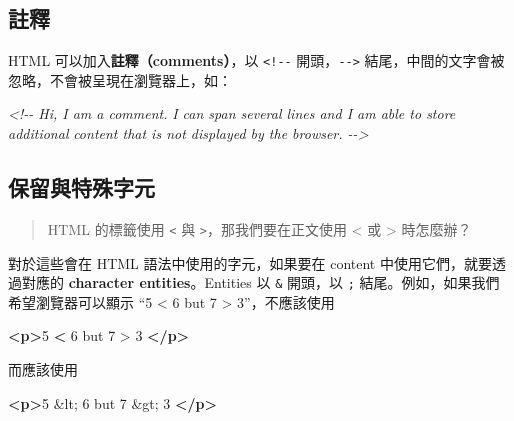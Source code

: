 \documentclass[
]{book}
\newenvironment{Shaded}{\begin{snugshade}}{\end{snugshade}}
\newcommand{\CommentTok}[1]{\textcolor[rgb]{0.56,0.35,0.01}{\textit{#1}}}
\newcommand{\DecValTok}[1]{\textcolor[rgb]{0.00,0.00,0.81}{#1}}
\newcommand{\ErrorTok}[1]{\textcolor[rgb]{0.64,0.00,0.00}{\textbf{#1}}}
\newcommand{\KeywordTok}[1]{\textcolor[rgb]{0.13,0.29,0.53}{\textbf{#1}}}
\newcommand{\NormalTok}[1]{#1}
\theoremstyle{definition}
\theoremstyle{remark}
\begin{document}
\hypertarget{ux8a3bux91cb}{%
\subsection{註釋}\label{ux8a3bux91cb}}

HTML 可以加入\textbf{註釋（comments）}，以 \texttt{\textless{}!-\/-} 開頭，\texttt{-\/-\textgreater{}} 結尾，中間的文字會被忽略，不會被呈現在瀏覽器上，如：

\begin{Shaded}
\begin{Highlighting}[]
\CommentTok{\textless{}!{-}{-} Hi, I am a comment.}
\CommentTok{I can span several lines and I am able to store additional}
\CommentTok{  content that is not displayed by the browser. {-}{-}\textgreater{}}
\end{Highlighting}
\end{Shaded}

\hypertarget{ux4fddux7559ux8207ux7279ux6b8aux5b57ux5143}{%
\subsection{保留與特殊字元}\label{ux4fddux7559ux8207ux7279ux6b8aux5b57ux5143}}

\begin{quote}
HTML 的標籤使用 \texttt{\textless{}} 與 \texttt{\textgreater{}}，那我們要在正文使用 \textless{} 或 \textgreater{} 時怎麼辦？
\end{quote}

對於這些會在 HTML 語法中使用的字元，如果要在 content 中使用它們，就要透過對應的 \textbf{character entities}。Entities 以 \texttt{\&} 開頭，以 \texttt{;} 結尾。例如，如果我們希望瀏覽器可以顯示 ``5 \textless{} 6 but 7 \textgreater{} 3''，不應該使用

\begin{Shaded}
\begin{Highlighting}[]
\KeywordTok{\textless{}p\textgreater{}}\NormalTok{5 }\ErrorTok{\textless{}}\NormalTok{ 6 but 7 \textgreater{} 3 }\KeywordTok{\textless{}/p\textgreater{}}
\end{Highlighting}
\end{Shaded}

而應該使用

\begin{Shaded}
\begin{Highlighting}[]
\KeywordTok{\textless{}p\textgreater{}}\NormalTok{5 }\DecValTok{\&lt;}\NormalTok{ 6 but 7 }\DecValTok{\&gt;}\NormalTok{ 3 }\KeywordTok{\textless{}/p\textgreater{}}
\end{Highlighting}
\end{Shaded}
\end{document}
